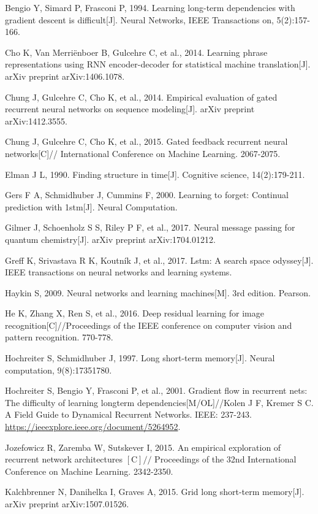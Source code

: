 \documentclass[10pt]{article}
\begin{document}
Bengio Y, Simard P, Frasconi P, 1994. Learning long-term dependencies with gradient descent is difficult[J]. Neural Networks, IEEE Transactions on, 5(2):157-166.

Cho K, Van Merriënboer B, Gulcehre C, et al., 2014. Learning phrase representations using RNN encoder-decoder for statistical machine translation[J]. arXiv preprint arXiv:1406.1078.

Chung J, Gulcehre C, Cho K, et al., 2014. Empirical evaluation of gated recurrent neural networks on sequence modeling[J]. arXiv preprint arXiv:1412.3555.

Chung J, Gulcehre C, Cho K, et al., 2015. Gated feedback recurrent neural networks[C]// International Conference on Machine Learning. 2067-2075.

Elman J L, 1990. Finding structure in time[J]. Cognitive science, 14(2):179-211.

Gers F A, Schmidhuber J, Cummins F, 2000. Learning to forget: Continual prediction with 1stm[J]. Neural Computation.

Gilmer J, Schoenholz S S, Riley P F, et al., 2017. Neural message passing for quantum chemistry[J]. arXiv preprint arXiv:1704.01212.

Greff K, Srivastava R K, Koutník J, et al., 2017. Lstm: A search space odyssey[J]. IEEE transactions on neural networks and learning systems.

Haykin S, 2009. Neural networks and learning machines[M]. 3rd edition. Pearson.

He K, Zhang X, Ren S, et al., 2016. Deep residual learning for image recognition[C]//Proceedings of the IEEE conference on computer vision and pattern recognition. 770-778.

Hochreiter S, Schmidhuber J, 1997. Long short-term memory[J]. Neural computation, 9(8):17351780.

Hochreiter S, Bengio Y, Frasconi P, et al., 2001. Gradient flow in recurrent nets: The difficulty of learning longterm dependencies[M/OL]//Kolen J F, Kremer S C. A Field Guide to Dynamical Recurrent Networks. IEEE: 237-243. \href{https://ieeexplore.ieee.org/document/5264952}{https://ieeexplore.ieee.org/document/5264952}.

Jozefowicz R, Zaremba W, Sutskever I, 2015. An empirical exploration of recurrent network architectures $[\mathrm{C}] / /$ Proceedings of the 32nd International Conference on Machine Learning. 2342-2350.

Kalchbrenner N, Danihelka I, Graves A, 2015. Grid long short-term memory[J]. arXiv preprint arXiv:1507.01526.
\end{document}
